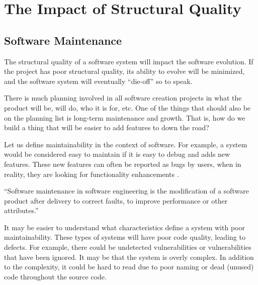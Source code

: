 \documentclass[12pt,conference]{IEEEtran}
\begin{document}

\vspace{0.5cm}
\section{The Impact of Structural Quality}
\vspace{0.25cm}

\subsection{Software Maintenance}

The structural quality of a software system will impact the software evolution. If the project has poor structural quality, its ability to evolve will be minimized, and the software system will eventually ``die-off'' so to speak.

There is much planning involved in all software creation projects in what the product will be, will do, who it is for, etc. One of the things that should also be on the planning list is long-term maintenance and growth. That is, how do we build a thing that will be easier to add features to down the road?

Let us define maintainability in the context of software. For example, a system would be considered easy to maintain if it is easy to debug and adds new features. These new features can often be reported as bugs by users, when in reality, they are looking for functionality enhancements \cite{wiki:software-maintenance}.

\vspace{0.25cm}

\begin{displayquote}
``Software maintenance in software engineering is the modification of a software product after delivery to correct faults, to improve performance or other attributes.'' \cite{wiki:software-maintenance}
\end{displayquote}

\vspace{0.25cm}

It may be easier to understand what characteristics define a system with poor maintainability. These types of systems will have poor code quality, leading to defects. For example, there could be undetected vulnerabilities or vulnerabilities that have been ignored. It may be that the system is overly complex. In addition to the complexity, it could be hard to read due to poor naming or dead (unused) code throughout the source code.
\end{document}
